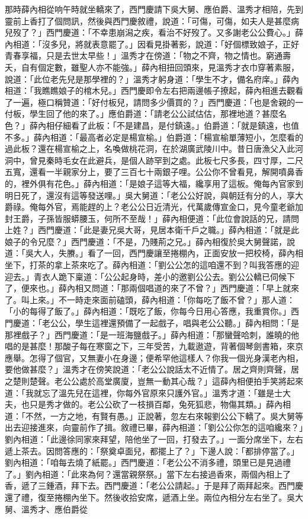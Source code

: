 那時薛內相從响午時就坐轎來了，西門慶請下吳大舅、應伯爵、溫秀才相陪，先到靈前上香打了個問訊，然後與西門慶敘禮，說道：「可傷，可傷，如夫人是甚麼病兒歿了？」西門慶道：「不幸患崩潟之疾，看治不好歿了。又多謝老公公費心。」薛內相道：「沒多兒，將就表意罷了。」因看見掛著影，說道：「好個標致娘子，正好青春享福，只是去世太早些！」溫秀才在傍道：「物之不齊，物之情也。窮通壽夭，自有個定數，雖聖人亦不能強。」薛內相扭回頭來，見溫秀才衣巾穿著素服，說道：「此位老先兒是那學裡的？」溫秀才躬身道：「學生不才，備名府庠。」薛內相道：「我瞧瞧娘子的棺木兒。」西門慶即令左右把兩邊帳子撩起，薛內相進去觀看了一遍，極口稱贊道：「好付板兒，請問多少價買的？」西門慶道：「也是舍親的一付板，學生回了他的來了。」應伯爵道：「請老公公試估估，那裡地道？甚麼名色？」薛內相仔細看了此板：「不是建昌，是付鎮遠。」伯爵道：「就是鎮遠，也值不多。」薛內相道：「最高者必定是楊宣榆。」伯爵道：「楊宣榆單薄短小，怎麼看的過此板？還在楊宣榆之上，名喚做桃花洞，在於湖廣武陵川中。昔日唐漁父入此河洞中，曾見秦時毛女在此避兵，是個人跡罕到之處。此板七尺多長，四寸厚，二尺五寬，還看一半親家分上，要了三百七十兩銀子哩。公公你不曾看見，解開噴鼻香的，裡外俱有花色。」薛內相道：「是娘子這等大福，纔享用了這板。俺每內官家到明日死了，還沒有這等發送哩。」吳大舅道：「老公公好說，與朝廷有分的人，享大爵祿。俺每外官，焉能趕的上？老公公日近清光，代萬歲傳宣金口，見今童老爺加封王爵，子孫皆服蟒腰玉，何所不至哉！」薛內相便道：「此位會說話的兄，請問上姓？」西門慶道：「此是妻兄吳大哥，見居本衛千戶之職。」薛內相道：「就是此娘子的令兄麼？」西門慶道：「不是，乃賤荊之兄。」薛內相復於吳大舅聲諾，說道：「吳大人，失賸。」看了一回，西門慶讓至捲棚內，正面安放一把校椅，薛內相坐下，打茶的拿上茶來吃了。薛內相道：「劉公公怎的這咱還不到？叫我答應的迎迎去。」青衣人跪下稟道：「公公起身時，差小的邀劉公公去。劉公公轎已伺候下了，便來也。」薛內相又問道：「那兩個唱道的來了不曾？」西門慶道：「早上就來了。叫上來。」不一時走來面前磕頭，薛內相道：「你每吃了飯不曾？」那人道：「小的每得了飯了。」薛內相道：「既吃了飯，你每今日用心答應，我重賞你。」西門慶道：「老公公，學生這裡還預備了一起戲子，唱與老公公聽。」薛內相問：「是那裡戲子？」西門慶道：「是一班海鹽戲子。」薛內相道：「那蠻聲哈刺，誰曉的他唱的是甚麼！那酸子每在寒窗之下，三年受苦，九載遨遊，背著個琴劍書箱，來京應舉。怎得了個官，又無妻小在身邊；便希罕他這樣人？你我一個光身漢老內相，要他做甚麼？」溫秀才在傍笑說道：「老公公說話太不近情了。居之齊則齊聲，居之楚則楚聲。老公公處於高堂廣廈，豈無一動其心哉？」這薛內相便拍手笑將起來道：「我就忘了溫先兒在這裡，你每外官原來只護外官。」溫秀才道：「雖是士大夫，也只是秀才做的。老公公砍了一枝損百鄰，兔死狐悲，物傷其類。」薛內相道：「不然，一方之地，有賢有愚。」正說著，忽左右來報劉公公下轎了。吳大舅等出去迎接進來，向靈前作了揖。敘禮已畢，薛內相道：「劉公公你怎的這咱纔來？」劉內相道：「此邊徐同家來拜望，陪他坐了一回，打發去了。」一面分席坐下，左右遞上茶去。因問答應的：「祭奠卓面兒，都擺上了？」下邊人說：「都排停當了。」劉內相道：「咱每去燒了紙罷。」西門慶道：「老公公不消多禮，頭里已是見過禮了。」劉內相道：「此來為何？還當親祭祭。」當下左右接過香來，兩個內相上了香，遞了三鍾酒，拜下去。西門慶道：「老公公請起。」于是拜了兩拜起來。西門慶還了禮，復至捲棚內坐下。然後收拾安席，遞酒上坐。兩位內相分左右坐了。吳大舅、溫秀才、應伯爵從